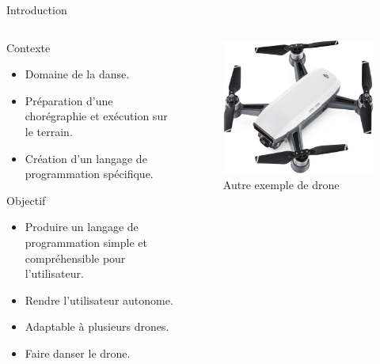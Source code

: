 \documentclass{bredelebeamer}
\begin{document}
\begin{frame}{Introduction}
\begin{columns}
\begin{column}{0.5\textwidth}
\begin{block}{Contexte}
\begin{itemize}
\item Domaine de la danse.
\item Préparation d'une chorégraphie et exécution sur le terrain.
\item Création d'un langage de programmation spécifique.
\end{itemize}
\end{block}
\begin{block}{Objectif}
\begin{itemize}
\item Produire un langage de programmation \alert{simple} et \alert{compréhensible} pour l'utilisateur.
\item Rendre l'utilisateur autonome.
\item Adaptable à plusieurs drones.
\item Faire danser le drone.
\end{itemize}
\end{block}
\end{column}
\begin{column}{0.5\textwidth}
\begin{figure}
\centering
\includegraphics[scale=0.15]{images/img2.jpg}
\caption{Autre exemple de drone}
\end{figure}
\end{column}
\end{columns}
\end{frame}
\end{document}

